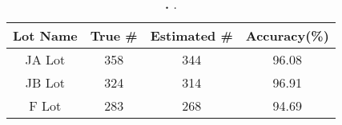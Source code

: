 \begin{table}[t]
\begin{threeparttable}
{\small
\begin{tabularx}{\columnwidth}{cccc}
{\normalsize{\textbf{Lot Name}}} & 
{\normalsize{\textbf{True \# }}} & 
{\normalsize{\textbf{Estimated \# }}} &
{\normalsize{\textbf{Accuracy(\%)}}} \\
\toprule
JA Lot & 358 & 344 & 96.08 \\
JB Lot & 324 & 314 & 96.91 \\
F Lot & 283 & 268 & 94.69 \\
\end{tabularx}
}
\caption{\textbf{.} .}
\label{table-capacity}
\end{threeparttable}
\end{table}
